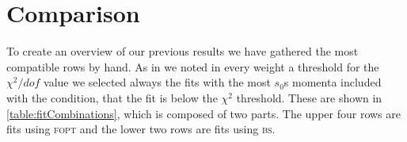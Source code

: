 \documentclass[../../index.tex]{subfiles}
\begin{document}
\section{Comparison}
To create an overview of our previous results we have gathered the most
compatible rows by hand. As in we noted in every weight a threshold for the
\(\chi^2/dof\) value we selected always the fits with the most \(s_0\)s momenta
included with the condition, that the fit is below the \(\chi^2\) threshold.
These are shown in \cref{table:fitCombinations}, which is composed of two parts.
The upper four rows are fits using \textsc{fopt} and the lower two rows are fits
using \textsc{bs}.
\begin{table}
  \centering {}
  \caption{Table of the best fits (selected by \(\chi^2/dof\) and compatibility
    of the fitting values) for each weight including at least the strong
    coupling \(\alpha_s(m_\tau^2)\) as a fitting variable. All fits have been
    performed using \textsc{fopt}, except weights marked with a star
    \(\omega^*\), which have been fitted using the \textit{Borel sum}.}
  \label{table:fitCombinations}
\end{table}
\end{document}
